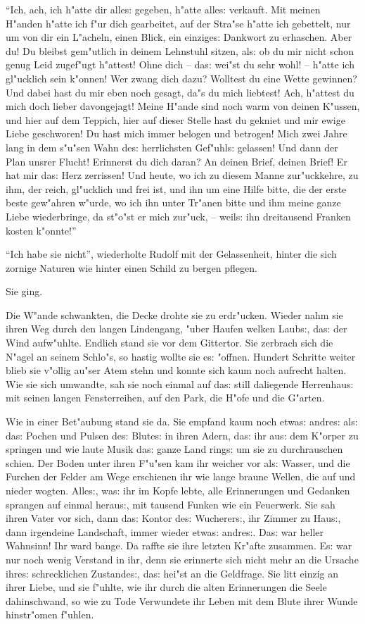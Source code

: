 \documentclass[oneside,12pt]{book}
\newcommand{\s}{s:}%
\begin{document}
"`Ich, ach, ich h"atte dir alle{\s} gegeben, h"atte alle{\s}
verkauft. Mit meinen H"anden h"atte ich f"ur dich gearbeitet, auf
der Stra"se h"atte ich gebettelt, nur um von dir ein L"acheln,
einen Blick, ein einzige{\s} Dankwort zu erhaschen. Aber du! Du
bleibst gem"utlich in deinem Lehnstuhl sitzen, al{\s} ob du mir
nicht schon genug Leid zugef"ugt h"attest! Ohne dich -- da{\s}
wei"st du sehr wohl! -- h"atte ich gl"ucklich sein k"onnen! Wer
zwang dich dazu? Wolltest du eine Wette gewinnen? Und dabei hast
du mir eben noch gesagt, da"s du mich liebtest! Ach, h"attest du
mich doch lieber davongejagt! Meine H"ande sind noch warm von
deinen K"ussen, und hier auf dem Teppich, hier auf dieser Stelle
hast du gekniet und mir ewige Liebe geschworen! Du hast mich immer
belogen und betrogen! Mich zwei Jahre lang in dem s"u"sen Wahn
de{\s} herrlichsten Gef"uhl{\s} gelassen! Und dann der Plan unsrer
Flucht! Erinnerst du dich daran? An deinen Brief, deinen Brief! Er
hat mir da{\s} Herz zerrissen! Und heute, wo ich zu diesem Manne
zur"uckkehre, zu ihm, der reich, gl"ucklich und frei ist, und ihn
um eine Hilfe bitte, die der erste beste gew"ahren w"urde, wo ich
ihn unter Tr"anen bitte und ihm meine ganze Liebe wiederbringe, da
st"o"st er mich zur"uck, -- weil{\s} ihn dreitausend Franken
kosten k"onnte!"'

"`Ich habe sie nicht"', wiederholte Rudolf mit der Gelassenheit,
hinter die sich zornige Naturen wie hinter einen Schild zu bergen
pflegen.

Sie ging.

Die W"ande schwankten, die Decke drohte sie zu erdr"ucken. Wieder
nahm sie ihren Weg durch den langen Lindengang, "uber Haufen
welken Laub{\s}, da{\s} der Wind aufw"uhlte. Endlich stand sie vor
dem Gittertor. Sie zerbrach sich die N"agel an seinem Schlo"s, so
hastig wollte sie e{\s} "offnen. Hundert Schritte weiter blieb sie
v"ollig au"ser Atem stehn und konnte sich kaum noch aufrecht
halten. Wie sie sich umwandte, sah sie noch einmal auf da{\s}
still daliegende Herrenhau{\s} mit seinen langen Fensterreihen,
auf den Park, die H"ofe und die G"arten.

Wie in einer Bet"aubung stand sie da. Sie empfand kaum noch
etwa{\s} andre{\s} al{\s} da{\s} Pochen und Pulsen de{\s}
Blute{\s} in ihren Adern, da{\s} ihr au{\s} dem K"orper zu
springen und wie laute Musik da{\s} ganze Land ring{\s} um sie zu
durchrauschen schien. Der Boden unter ihren F"u"sen kam ihr
weicher vor al{\s} Wasser, und die Furchen der Felder am Wege
erschienen ihr wie lange braune Wellen, die auf und nieder wogten.
Alle{\s}, wa{\s} ihr im Kopfe lebte, alle Erinnerungen und
Gedanken sprangen auf einmal herau{\s}, mit tausend Funken wie ein
Feuerwerk. Sie sah ihren Vater vor sich, dann da{\s} Kontor de{\s}
Wucherer{\s}, ihr Zimmer zu Hau{\s}, dann irgendeine Landschaft,
immer wieder etwa{\s} andre{\s}. Da{\s} war heller Wahnsinn! Ihr
ward bange. Da raffte sie ihre letzten Kr"afte zusammen. E{\s} war
nur noch wenig Verstand in ihr, denn sie erinnerte sich nicht mehr
an die Ursache ihre{\s} schrecklichen Zustande{\s}, da{\s} hei"st
an die Geldfrage. Sie litt einzig an ihrer Liebe, und sie f"uhlte,
wie ihr durch die alten Erinnerungen die Seele dahinschwand, so
wie zu Tode Verwundete ihr Leben mit dem Blute ihrer Wunde
hinstr"omen f"uhlen.
\end{document}
